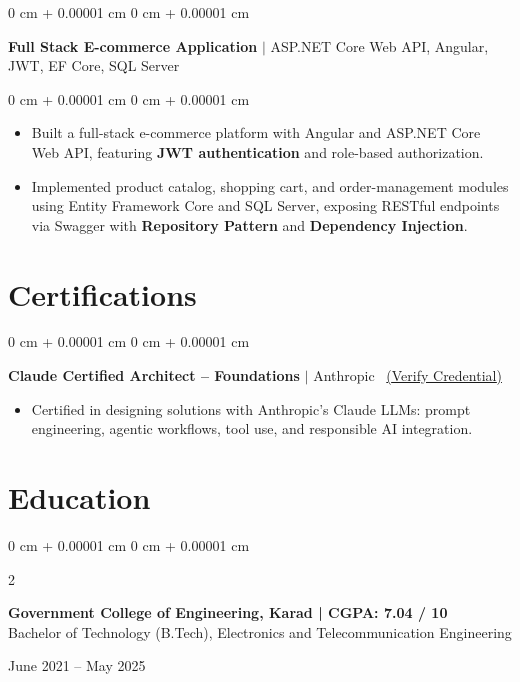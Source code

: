 \documentclass[10pt, letterpaper]{article}
\newenvironment{highlights}{
    \begin{itemize}[
        topsep=0.10 cm,
        parsep=0.10 cm,
        partopsep=0pt,
        itemsep=0pt,
        leftmargin=0 cm + 10pt
    ]
}{
    \end{itemize}
} %
\newenvironment{onecolentry}{
    \begin{adjustwidth}{
        0 cm + 0.00001 cm
    }{
        0 cm + 0.00001 cm
    }
}{
    \end{adjustwidth}
} %
\newenvironment{twocolentry}[2][]{
    \onecolentry
    \def\secondColumn{#2}
    \setcolumnwidth{\fill, 4.5 cm}
    \begin{paracol}{2}
}{
    \switchcolumn \raggedleft \secondColumn
    \end{paracol}
    \endonecolentry
} %
\let\hrefWithoutArrow\href
\begin{document}
        \vspace{0.2 cm}

        \begin{onecolentry}
            \textbf{Full Stack E-commerce Application} $|$ ASP.NET Core Web API, Angular, JWT, EF Core, SQL Server
        \end{onecolentry}

        \vspace{0.10 cm}
        \begin{onecolentry}
            \begin{highlights}
                \item Built a full-stack e-commerce platform with Angular and ASP.NET Core Web API, featuring \textbf{JWT authentication} and role-based authorization.
                \item Implemented product catalog, shopping cart, and order-management modules using Entity Framework Core and SQL Server, exposing RESTful endpoints via Swagger with \textbf{Repository Pattern} and \textbf{Dependency Injection}.
            \end{highlights}
        \end{onecolentry}


    \section{Certifications}

        \begin{onecolentry}
            \textbf{Claude Certified Architect -- Foundations} $|$ Anthropic \, \hrefWithoutArrow{https://verify.skilljar.com/c/jew7skpwvfpx}{(\underline{Verify Credential})}
            \begin{highlights}
                \item Certified in designing solutions with Anthropic's Claude LLMs: prompt engineering, agentic workflows, tool use, and responsible AI integration.
            \end{highlights}
        \end{onecolentry}


    \section{Education}

        \begin{twocolentry}{June 2021 -- May 2025}
            \textbf{Government College of Engineering, Karad | CGPA: 7.04 / 10} \\
            Bachelor of Technology (B.Tech), Electronics and Telecommunication Engineering
        \end{twocolentry}
\end{document}

